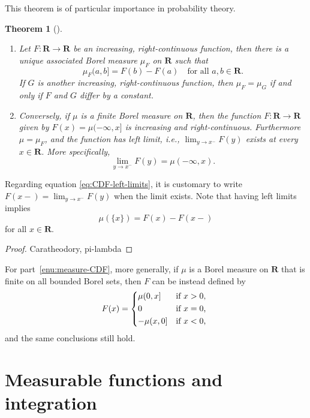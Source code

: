 \documentclass[10pt]{article}
\numberwithin{equation}{section}
\theoremstyle{plain-star}
\newtheorem{thm}[equation]{Theorem}
\theoremstyle{definition-star}
\theoremstyle{remark-star}
\theoremstyle{plain-star}
\newcommand{\R}{\mathbf{R}}
\begin{document}
This theorem is of particular importance in probability theory.

\begin{thm}[{\cite[Theorem~1.16]{folland1999}}] \label{thm:increasing-rcont-Borel-measure-connection} \leavevmode
    \begin{enumerate}
        \item \label{enu:CDF-measure} Let $F\colon \R \to \R$ be an increasing, right-continuous function, then there is a unique associated Borel measure $\mu_F$ on $\R$ such that \[
        \mu_F(a,b] = F(b) - F(a)\quad \text{for all }a,b\in \R.
    \] If $G$ is another increasing, right-continuous function, then $\mu_F = \mu_G$ if and only if $F$ and $G$ differ by a constant.
        \item \label{enu:measure-CDF} Conversely, if $\mu$ is a finite Borel measure on $\R$, then the function $F\colon \R \to \R$ given by $F(x) = \mu(-\infty,x]$ is increasing and right-continuous. Furthermore $\mu = \mu_F$, and the function has left limit, i.e., $\lim_{y \to x^-} F(y)$ exists at every $x \in \R$. More specifically, \begin{equation} \label{eq:CDF-left-limits}
             \lim_{y \to x^-} F(y) = \mu(-\infty,x).
        \end{equation}
    \end{enumerate}
\end{thm}

Regarding equation \eqref{eq:CDF-left-limits}, it is customary to write $F(x-) = \lim_{y \to x^-} F(y)$ when the limit exists. Note that having left limits implies \[\mu(\{x\}) = F(x) - F(x-)\] for all $x \in \R$.

\begin{proof}
    Caratheodory, pi-lambda
\end{proof}

    For part~\ref{enu:measure-CDF}, more generally, if $\mu$ is a Borel measure on $\R$ that is finite on all bounded Borel sets, then $F$ can be instead defined by \[
        F(x) = \begin{cases*}
            \mu (0,x] & if $x > 0$, \\
            0 & if $x = 0$, \\
            -\mu(x,0] & if $x < 0$,
        \end{cases*}
    \] and the same conclusions still hold.

\section{Measurable functions and integration}
\end{document}
